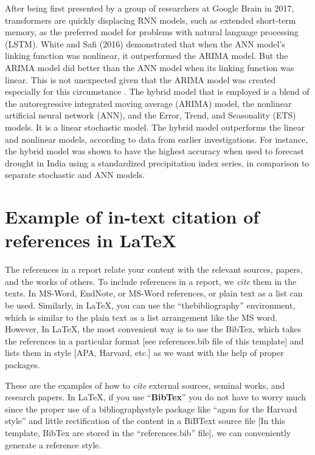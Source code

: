 After being first presented by a group of researchers at Google Brain in 2017, transformers are 
quickly displacing RNN models, such as extended short-term memory, as the preferred model for 
problems with natural language processing (LSTM). White and Safi (2016) demonstrated that when 
the ANN model's linking function was nonlinear, it outperformed the ARIMA model. But the ARIMA 
model did better than the ANN model when its linking function was linear. This is not 
unexpected given that the ARIMA model was created especially for this circumstance 
\citep{safi2021hybrid}. The hybrid model that is employed is a blend of the autoregressive 
integrated moving average (ARIMA) model, the nonlinear artificial neural network (ANN), and the 
Error, Trend, and Seasonality (ETS) models. It is a linear stochastic model. The hybrid model 
outperforms the linear and nonlinear models, according to data from earlier investigations. For 
instance, the hybrid model was shown to have the highest accuracy when used to forecast drought 
in India using a standardized precipitation index series, in comparison to separate stochastic 
and ANN models.


\section{Example of in-text citation of references in \LaTeX} 
The references in a report relate your content with the relevant sources, papers, and the works of others. To include references in a report, we \textit{cite} them in the texts. In MS-Word, EndNote, or MS-Word references, or plain text as a list can be used. Similarly, in \LaTeX, you can use the ``thebibliography'' environment, which is similar to the plain text as a list arrangement like the MS word. However, In \LaTeX, the most convenient way is to use the BibTex, which takes the references in a particular format [see references.bib file of this template] and lists them in style [APA, Harvard, etc.] as we want with the help of proper packages.    

These are the examples of how to \textit{cite} external sources, seminal works, and research papers. In \LaTeX, if you use ``\textbf{BibTex}'' you do not have to worry much since the proper use of a bibliographystyle package like ``agsm for the Harvard style'' and little rectification of the content in a BiBText source file [In this template, BibTex are stored in the ``references.bib'' file], we can conveniently generate  a reference style. 

